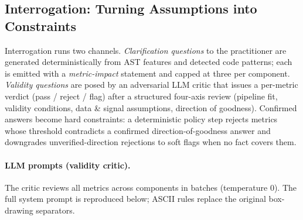 \documentclass[11pt]{article}
\begin{document}
\subsection{Interrogation: Turning Assumptions into Constraints}
\label{app:impl-interrogation}

Interrogation runs two channels. \emph{Clarification questions} to the practitioner are generated deterministically from AST features and detected code patterns; each is emitted with a \emph{metric-impact} statement and capped at three per component. \emph{Validity questions} are posed by an adversarial LLM critic that issues a per-metric verdict (pass / reject / flag) after a structured four-axis review (pipeline fit, validity conditions, data \& signal assumptions, direction of goodness). Confirmed answers become hard constraints: a deterministic policy step rejects metrics whose threshold contradicts a confirmed direction-of-goodness answer and downgrades unverified-direction rejections to soft flags when no fact covers them.

\paragraph{LLM prompts (validity critic).} The critic reviews all metrics across components in batches (temperature $0$). The full system prompt is reproduced below; ASCII rules replace the original box-drawing separators.
\end{document}
